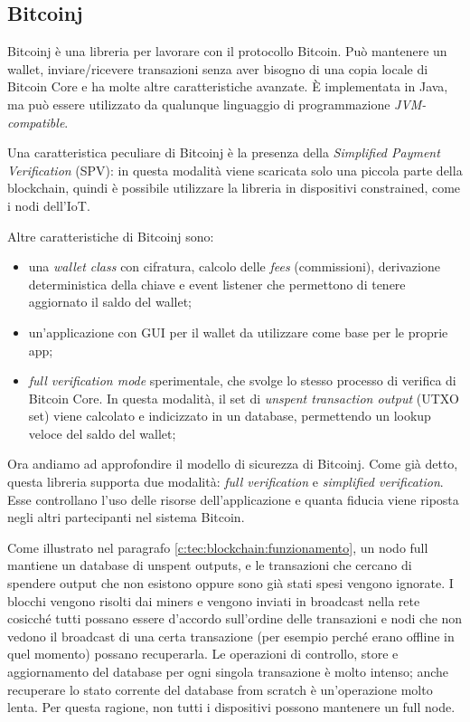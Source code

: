 \subsection{Bitcoinj}
\label{c:integr:lib:bitcoinj}

Bitcoinj è una libreria per lavorare con il protocollo Bitcoin. Può mantenere un wallet, inviare/ricevere transazioni senza aver bisogno di una copia locale di Bitcoin Core e ha molte altre caratteristiche avanzate. È implementata in Java, ma può essere utilizzato da qualunque linguaggio di programmazione \textit{JVM-compatible}.

Una caratteristica peculiare di Bitcoinj è la presenza della \textit{Simplified Payment Verification} (SPV): in questa modalità viene scaricata solo una piccola parte della blockchain, quindi è possibile utilizzare la libreria in dispositivi constrained, come i nodi dell'IoT. 

Altre caratteristiche di Bitcoinj sono: 
\begin{itemize}
    \item una \textit{wallet class} con cifratura, calcolo delle \textit{fees} (commissioni), derivazione deterministica della chiave e event listener che permettono di tenere aggiornato il saldo del wallet;
    \item un'applicazione con GUI per il wallet da utilizzare come base per le proprie app;
    \item \textit{full verification mode} sperimentale, che svolge lo stesso processo di verifica di Bitcoin Core. In questa modalità, il set di \textit{unspent transaction output} (UTXO set) viene calcolato e indicizzato in un database, permettendo un lookup veloce del saldo del wallet;
\end{itemize}

Ora andiamo ad approfondire il modello di sicurezza di Bitcoinj. Come gi\`a detto, questa libreria supporta due modalità: \textit{full verification} e \textit{simplified verification}. Esse controllano l'uso delle risorse dell'applicazione e quanta fiducia viene riposta negli altri partecipanti nel sistema Bitcoin. 

Come illustrato nel paragrafo \ref{c:tec:blockchain:funzionamento}, un nodo full mantiene un database di unspent outputs, e le transazioni che cercano di spendere output che non esistono oppure sono già stati spesi vengono ignorate. I blocchi vengono risolti dai miners e vengono inviati in broadcast nella rete cosicché tutti possano essere d'accordo sull'ordine delle transazioni e nodi che non vedono il broadcast di una certa transazione (per esempio perché erano offline in quel momento) possano recuperarla. 
Le operazioni di controllo, store e aggiornamento del database per ogni singola transazione è molto intenso; anche recuperare lo stato corrente del database from scratch è un'operazione molto lenta. Per questa ragione, non tutti i dispositivi possono mantenere un full node.

